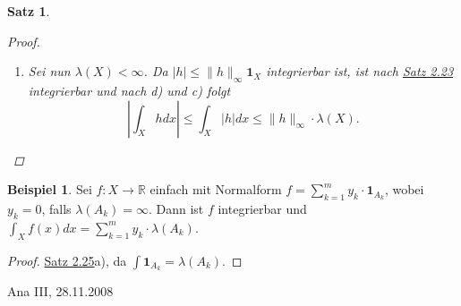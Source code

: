 \documentclass[a4paper]{report}
\newcommand{\doubleOne}{\textbf{1}}
\newcommand{\R}{\mathbb{R}}
\newcommand{\jlabel}[1]{\label{j_#1}}
\newcommand{\jhyperref}[2]{\hyperref[j_#1]{#2}}
\newcommand{\jlink}[1]{\jhyperref{#1}{#1}}
\newcommand{\jabb}[3]{ #1: #2 \rightarrow #3 }
\newcommand{\jspacesmall}{\vspace{4pt}}
\newcommand{\jdate}[1]{\jspacesmall\begin{center}\jlabel{#1}\tiny{Ana III, #1}\end{center}}
\theoremstyle{plain}
\newtheorem{satz}[thm]{Satz}
\theoremstyle{definition}
\newtheorem*{expl*}{Beispiel}
\begin{document}
{{{{\begin{satz}
\begin{proof}
\begin{enumerate}
            \item
                Sei nun $\lambda(X) < \infty$. Da $|h| \le \lVert h \rVert_\infty \doubleOne_X$ integrierbar ist, ist nach \jlink{Satz 2.23} integrierbar und nach d) und c) folgt
                \begin{displaymath}
                    \left| \int_X h dx \right| \le \int_X |h| dx \le \lVert h \rVert_\infty \cdot \lambda(X).
                \end{displaymath}
        \end{enumerate}
    \end{proof}
\end{satz}

\begin{expl*}
    Sei $\jabb{f}{X}{\R}$ einfach mit Normalform $f = \sum_{k=1}^m y_k \cdot \doubleOne_{A_k}$, wobei $y_k=0$, falls $\lambda(A_k) = \infty$. Dann ist $f$ integrierbar und $\int_X f(x)dx = \sum_{k=1}^m y_k\cdot \lambda(A_k)$.
    \begin{proof}
        \jlink{Satz 2.25}a), da $\int \doubleOne_{A_k} = \lambda(A_k)$.
    \end{proof}
\end{expl*}


\jdate{28.11.2008}


}}}}
\end{document}
